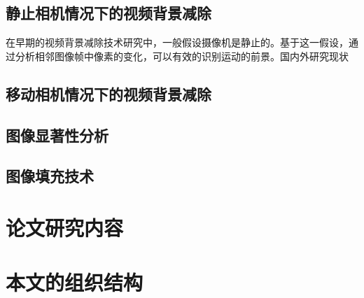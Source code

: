 \subsection{静止相机情况下的视频背景减除}
\label{sec:staticCamera}
在早期的视频背景减除技术研究中，一般假设摄像机是静止的。基于这一假设，通过分析相邻图像帧中像素的变化，可以有效的识别运动的前景。国内外研究现状

\subsection{移动相机情况下的视频背景减除}
\label{sec:movingCamera}

\subsection{图像显著性分析}
\label{sec:imageSaliency}


\subsection{图像填充技术}
\label{sec:imageInpainting}

\section{论文研究内容}
\label{sec:contents}


\section{本文的组织结构}
\label{sec:hierarchy} 